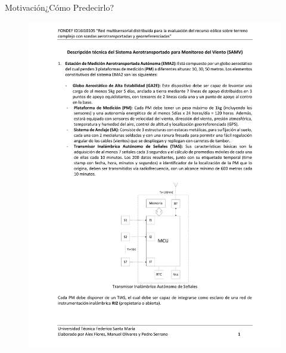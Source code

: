 \documentclass[mathserif]{beamer}
\begin{document}
\begin{frame}{Motivación}{¿Cómo Predecirlo?}
	\begin{figure}[h]
		\begin{minipage}{0.5\linewidth}
		\centering
		\includegraphics[width=1.0\linewidth,page=5,trim={5cm 9cm 2.3cm 3cm},clip]{fig/01/descrp}
		\end{minipage}%
		\begin{minipage}{0.5\linewidth}
			\centering

\end{minipage}
\end{figure}
\end{frame}
\end{document}
